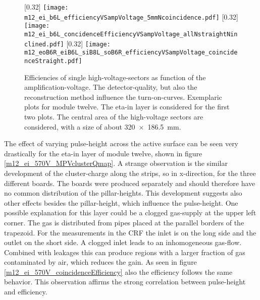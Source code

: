 \documentclass[
twoside,            %
BCOR1.4cm,          %
10pt,               %
headings=normal,    %
headsepline,        %
clearplainpage,		%
final,              %
div=14,
open=right,
bibliography=toc
]{scrreprt}
\begin{document}
\begin{figure}[!h]
	\centering
	[0.32\textwidth]
	{\texttt{[image: m12\_ei\_b6L\_efficiencyVSampVoltage\_5mmNcoincidence.pdf]}}
	\hfill
	[0.32\textwidth]
	{\texttt{[image: m12\_ei\_b6L\_concidenceEfficiencyVSampVoltage\_allNstraightNinclined.pdf]}}
	\hfill
	[0.32\textwidth]
	{\texttt{[image: m12\_eoB6R\_eiB6L\_siB8L\_soB6R\_efficiencyVSampVoltage\_coincidenceStraight.pdf]}}
	\vspace{-6mm}
	\caption{
		Efficiencies of single high-voltage-sectors as function of the amplification-voltage.
		The detector-quality, but also the reconstruction method influence the turn-on-curves.
		Exemplaric plots for module twelve.
		The eta-in layer is considered for the first two plots.
		The central area of the high-voltage sectors are considered, with a size of about \SI[product-units = repeat]{320 x 186.5}{mm}.
	}
	\label{effiVSampVoltage} 
\end{figure}

The effect of varying pulse-height across the active surface can be seen very drastically for the eta-in layer of module twelve, shown in figure \ref{m12_ei_570V_MPVclusterQmap}.
A strange observation is the similar development of the cluster-charge along the strips, so in x-direction, for the three different boards.
The boards were produced separately and should therefore have no common distribution of the pillar-heights.
This development suggests also other effects besides the pillar-height, which influence the pulse-height.
One possible explanation for this layer could be a clogged gas-supply at the upper left corner.
The gas is distributed from pipes placed at the parallel borders of the trapezoid.
For the measurements in the CRF the inlet is on the long side and the outlet on the short side.
A clogged inlet leads to an inhomogeneous gas-flow. 
Combined with leakages this can produce regions with a larger fraction of gas contaminated by air, which reduces the gain.
As seen in figure \ref{m12_ei_570V_coincidenceEfficiency} also the efficiency follows the same behavior.
This observation affirms the strong correlation between pulse-height and efficiency.
\end{document}
